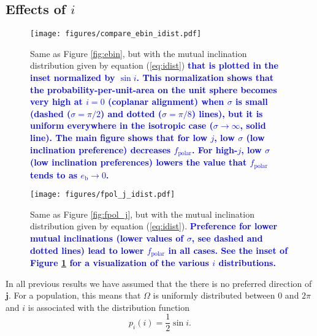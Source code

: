 \documentclass[twocolumn,linenumbers]{aastex631}
\newcommand{\RR}[1]{\textcolor{blue}{\bf#1}} %
\begin{document}
\subsection{Effects of $i$}
\label{subsec:change_i}

\begin{figure*}
    \begin{centering}
        \texttt{[image: figures/compare\_ebin\_idist.pdf]}
        \caption{
            Same as Figure \ref{fig:ebin}, but with the mutual inclination distribution given by equation (\ref{eq:idist}) \RR{that is plotted in the inset normalized by $\sin i$. This normalization shows that the probability-per-unit-area on the unit sphere becomes very high at $i=0$ (coplanar alignment) when $\sigma$ is small (dashed ($\sigma=\pi/2$) and dotted ($\sigma=\pi/8$) lines), but it is uniform everywhere in the isotropic case ($\sigma \rightarrow \infty$, solid line). The main figure shows that for low $j$, low $\sigma$ (low inclination preference) decreases $f_\text{polar}$. For high-$j$, low $\sigma$ (low inclination preferences) lowers the value that $f_\text{polar}$ tends to as $e_\text{b}\rightarrow 0$.}
        }
        \label{fig:ebin-idist}
    \end{centering}
\end{figure*}

\begin{figure*}
    \begin{centering}
        \texttt{[image: figures/fpol\_j\_idist.pdf]}
        \caption{
            Same as Figure \ref{fig:fpol_j}, but with the mutual inclination distribution given by equation (\ref{eq:idist}). \RR{Preference for lower mutual inclinations (lower values of $\sigma$, see dashed and dotted lines) lead to lower $f_\text{polar}$ in all cases. See the inset of Figure \ref{fig:ebin-idist} for a visualization of the various $i$ distributions.}
        }
        \label{fig:fpol_j-idist}
    \end{centering}
\end{figure*}


In all previous results we have assumed that the there is no preferred direction of $\bm{j}$. For a population, this means that $\Omega$ is uniformly distributed between $0$ and $2\pi$ and $i$ is associated with the distribution function
\begin{equation}
    \label{eq:iso-i}
    p_i(i) = \frac{1}{2}\sin{i} .
\end{equation}
\end{document}
